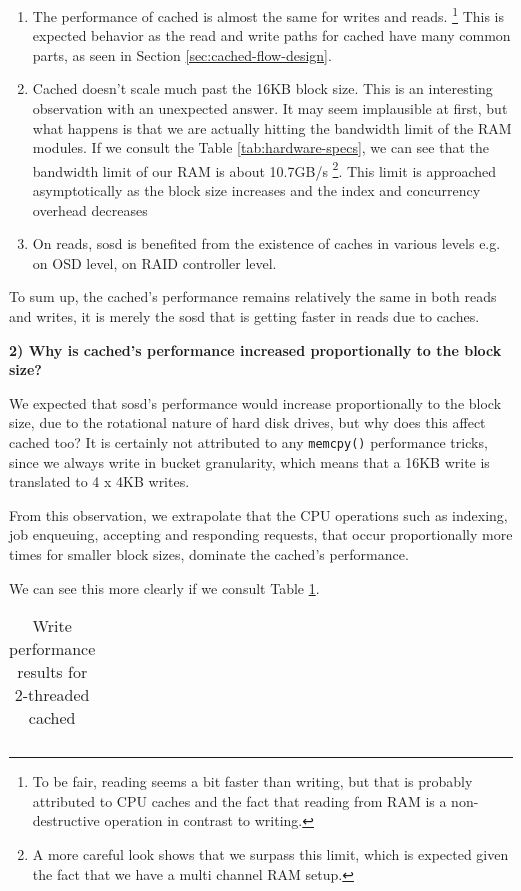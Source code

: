 \begin{enumerate}
	\item The performance of cached is almost the same for writes and reads.  
		\footnote{To be fair, reading seems a bit faster than writing, but that 
			is probably attributed to CPU caches and the fact that reading from 
			RAM is a non-destructive operation in contrast to writing.}
		This is expected behavior as the read and write paths for cached have 
		many common parts, as seen in Section \ref{sec:cached-flow-design}.
	\item Cached doesn't scale much past the 16KB block size. This is an 
		interesting observation with an unexpected answer. It may seem 
		implausible at first, but what happens is that we are actually hitting 
		the bandwidth limit of the RAM modules. If we consult the Table 
		\ref{tab:hardware-specs}, we can see that the bandwidth limit of our 
		RAM is about \mytilde10.7GB/s
		\footnote{A more careful look shows that we surpass this limit, 
			which is expected given the fact that we have a multi 
			channel RAM setup.}.
		This limit is approached asymptotically as the block size increases and 
		the index and concurrency overhead decreases
	\item On reads, sosd is benefited from the existence of caches in various 
		levels e.g. on OSD level, on RAID controller level.
\end{enumerate}

To sum up, the cached's performance remains relatively the same in both reads 
and writes, it is merely the sosd that is getting faster in reads due to 
caches. 

\textbf{2) Why is cached's performance increased proportionally to the block 
	size?}

We expected that sosd's performance would increase proportionally to the block 
size, due to the rotational nature of hard disk drives, but why does this 
affect cached too? It is certainly not attributed to any \texttt{memcpy()} 
performance tricks, since we always write in bucket granularity, which means 
that a 16KB write is translated to 4 x 4KB writes.

From this observation, we extrapolate that the CPU operations such as indexing,
job enqueuing, accepting and responding requests, that occur proportionally 
more times for smaller block sizes, dominate the cached's performance.

We can see this more clearly if we consult Table \ref{tab:2threads}.

\begin{table}[h!]
	\centering
	\begin{tabular}{ | l | l | l | l | l |}
		\hline
		
	\end{tabular}
	\caption{Write performance results for 2-threaded cached}
	\label{tab:2threads}
\end{table}

